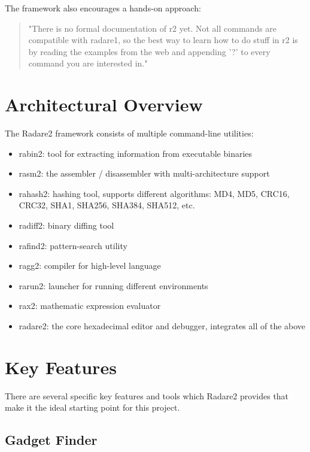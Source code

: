 The framework also encourages a hands-on approach:
\begin{quote}"There is no formal documentation of r2 yet. Not all commands are compatible with radare1, so the best way to learn how to do stuff in r2 is by reading the examples from the web and appending '?' to every command you are interested in."
\end{quote}



\section{Architectural Overview}
\label{sec:architecture}

The Radare2 framework consists of multiple command-line utilities:
\begin{itemize}
	\item rabin2: tool for extracting information from executable binaries
	\item rasm2: the assembler / disassembler with multi-architecture support
	\item rahash2: hashing tool, supports different algorithms: MD4, MD5, CRC16, CRC32, SHA1, SHA256, SHA384, SHA512, etc.
	\item radiff2: binary diffing tool
	\item rafind2: pattern-search utility
	\item ragg2: compiler for high-level language
	\item rarun2: launcher for running different environments
	\item rax2: mathematic expression evaluator
	\item radare2: the core hexadecimal editor and debugger, integrates all of the above
\end{itemize}


\section{Key Features}
\label{sec:features}

There are several specific key features and tools which Radare2 provides that make it the ideal starting point for this project.

\subsection{Gadget Finder}

